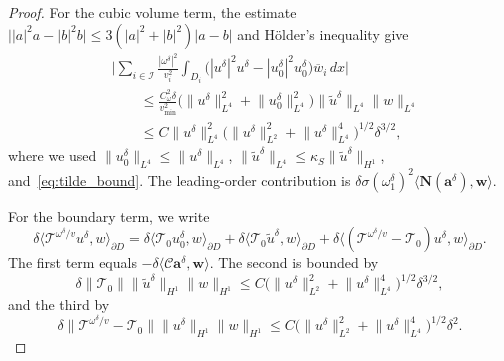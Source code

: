 \documentclass[10pt,a4paper]{amsart}
\renewcommand{\tilde}{\widetilde}
\begin{document}
\begin{proof}
    For the cubic volume term, the estimate
    $\bigl||a|^2 a - |b|^2 b\bigr| \leq 3(|a|^2 + |b|^2)|a - b|$
    and H\"older's inequality give
    \begin{equation}
        \begin{aligned}
            &\biggl\lvert
            \sum_{i \in \mathcal{I}} \frac{|\omega^\delta|^2}{v_i^2}
            \int_{D_i}
            \bigl(|u^\delta|^2 u^\delta
              - |u_0^\delta|^2 u_0^\delta\bigr)
            \overline{w}_i \, dx \biggr\rvert \\
            &\qquad\leq \frac{C_\omega^2 \delta}{v_{\min}^2}
            \bigl(
              \lVert u^\delta \rVert_{L^4}^2
              + \lVert u_0^\delta \rVert_{L^4}^2
            \bigr)
            \lVert \tilde{u}^\delta \rVert_{L^4}
            \lVert w \rVert_{L^4} \\
            &\qquad\leq C \lVert u^\delta \rVert_{L^4}^2
            \bigl( \lVert u^\delta \rVert_{L^2}^2
              + \lVert u^\delta \rVert_{L^4}^4 \bigr)^{1/2}
            \delta^{3/2},
        \end{aligned}
    \end{equation}
    where we used $\lVert u_0^\delta \rVert_{L^4}
    \leq \lVert u^\delta \rVert_{L^4}$,
    $\lVert \tilde{u}^\delta \rVert_{L^4}
    \leq \kappa_S \lVert \tilde{u}^\delta \rVert_{H^1}$,
    and~\eqref{eq:tilde_bound}. The leading-order contribution is
    $\delta \sigma (\omega_1^\delta)^2
    \langle \mathbf{N}(\mathbf{a}^\delta), \mathbf{w} \rangle$.

    For the boundary term, we write
    \begin{equation}
        \delta \langle \mathcal{T}^{\omega^\delta/v} u^\delta,
        w \rangle_{\partial D}
        = \delta \langle \mathcal{T}_0 u_0^\delta,
          w \rangle_{\partial D}
        + \delta \langle \mathcal{T}_0 \tilde{u}^\delta,
          w \rangle_{\partial D}
        + \delta \langle (\mathcal{T}^{\omega^\delta/v} - \mathcal{T}_0)
          u^\delta, w \rangle_{\partial D}.
    \end{equation}
    The first term equals
    $-\delta \langle \mathcal{C} \mathbf{a}^\delta,
    \mathbf{w} \rangle$. The second is bounded by
    \begin{equation}
        \delta \lVert \mathcal{T}_0 \rVert
        \lVert \tilde{u}^\delta \rVert_{H^1}
        \lVert w \rVert_{H^1}
        \leq C
        \bigl( \lVert u^\delta \rVert_{L^2}^2
          + \lVert u^\delta \rVert_{L^4}^4 \bigr)^{1/2}
        \delta^{3/2},
    \end{equation}
    and the third by
    \begin{equation}
        \delta \lVert \mathcal{T}^{\omega^\delta/v} - \mathcal{T}_0 \rVert
        \lVert u^\delta \rVert_{H^1}
        \lVert w \rVert_{H^1}
        \leq C
        \bigl( \lVert u^\delta \rVert_{L^2}^2
          + \lVert u^\delta \rVert_{L^4}^4 \bigr)^{1/2}
        \delta^2.
    \end{equation}


\end{proof}
\end{document}
